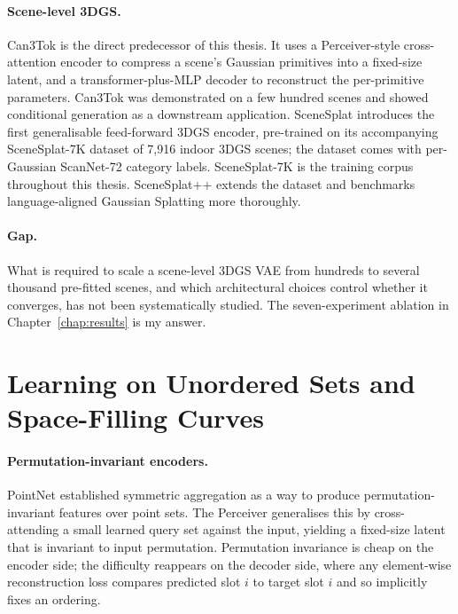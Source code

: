 \paragraph{Scene-level 3DGS.}
Can3Tok \citep{gao2025can3tok} is the direct predecessor of this thesis. It uses a Perceiver-style cross-attention encoder to compress a scene's Gaussian primitives into a fixed-size latent, and a transformer-plus-MLP decoder to reconstruct the per-primitive parameters. Can3Tok was demonstrated on a few hundred scenes and showed conditional generation as a downstream application. SceneSplat \citep{li2025scenesplat} introduces the first generalisable feed-forward 3DGS encoder, pre-trained on its accompanying SceneSplat-7K dataset of 7{,}916 indoor 3DGS scenes; the dataset comes with per-Gaussian ScanNet-72 \citep{dai2017scannet} category labels. SceneSplat-7K is the training corpus throughout this thesis. SceneSplat++ \citep{ma2025scenesplatpp} extends the dataset and benchmarks language-aligned Gaussian Splatting more thoroughly.

\paragraph{Gap.} What is required to scale a scene-level 3DGS VAE from hundreds to several thousand pre-fitted scenes, and which architectural choices control whether it converges, has not been systematically studied. The seven-experiment ablation in Chapter~\ref{chap:results} is my answer.

\section{Learning on Unordered Sets and Space-Filling Curves}
\label{sec:rw_sets}

\paragraph{Permutation-invariant encoders.}
PointNet \citep{qi2017pointnet} established symmetric aggregation as a way to produce permutation-invariant features over point sets. The Perceiver \citep{jaegle2021perceiver} generalises this by cross-attending a small learned query set against the input, yielding a fixed-size latent that is invariant to input permutation. Permutation invariance is cheap on the encoder side; the difficulty reappears on the decoder side, where any element-wise reconstruction loss compares predicted slot $i$ to target slot $i$ and so implicitly fixes an ordering.

